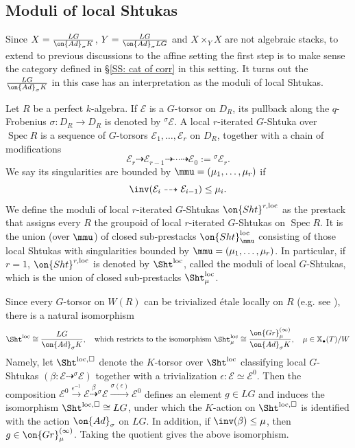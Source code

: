 \documentclass[11pt]{amsart}
\theoremstyle{definition}
\theoremstyle{definition}
\theoremstyle{definition}
\numberwithin{equation}{subsection}
\newcommand{\mE}{{\mathcal E}}
\newcommand{\Ad}{{\on{Ad}}}
\newcommand{\Gr}{{\on{Gr}}}
\DeclareMathOperator{\Spec}{Spec}
\newcommand{\loc}{\mathrm{loc}}
\def\xcoch{\mathbb{X}_\bullet}
\begin{document}
\subsection{Moduli of local Shtukas}

Since
$X=\frac{LG}{\Ad_\sigma K}$, $Y=\frac{LG}{\Ad_\sigma LG}$ and $X\times_YX$ are not algebraic stacks, to extend to previous discussions to the affine setting the first step is to make sense the category defined in \S \ref{SS: cat of corr} in this setting. It turns out 
the $\frac{LG}{\Ad_\sigma K}$ in this case has an interpretation as the moduli of local Shtukas.

Let $R$ be a perfect $k$-algebra.  If $\mE$ is a $G$-torsor on $D_R$, its pullback along the $q$-Frobenius $\sigma:D_R\to D_R$ is denoted by ${^\sigma}\mE$.
A local $r$-iterated $G$-Shtuka over $\Spec R$ is a sequence of $G$-torsors $\mE_1,\ldots, \mE_r$ on $D_{R}$, together with a chain of modifications
\[\mE_r\dashrightarrow \mE_{r-1}\dashrightarrow\cdots\dashrightarrow \mE_0:={^\sigma}\mE_r.\]
We say its singularities are bounded by $\mmu=(\mu_1,\ldots,\mu_r)$ if
\[\inv(\mE_i\dashrightarrow \mE_{i-1})\leq \mu_i.\]
We define the moduli of local $r$-iterated $G$-Shtukas $\on{Sht}^{r,\loc}$ as the prestack that assigns every $R$ the groupoid of local $r$-iterated $G$-Shtukas on $\Spec R$. It is the union (over $\mmu$) of closed sub-prestacks $\on{Sht}^{\loc}_{\mmu}$ consisting of those local Shtukas with singularities bounded by $\mmu=(\mu_1,\ldots,\mu_r)$.  In particular, if $r=1$, $\on{Sht}^{r,\loc}$ is denoted by $\Sht^\loc$, called the moduli of local $G$-Shtukas, which is the union of closed sub-prestacks $\Sht^\loc_\mu$.




Since every $G$-torsor on $W(R)$ can be trivialized \'etale locally on $R$ (e.g. see \cite[Lemma 1.3]{Zh1}), there is a natural isomorphism
\begin{equation}
\label{R:pre of Sht}
\Sht^\loc\cong \frac{LG}{\Ad_\sigma K},\quad \mbox{which restricts to the isomorphism } \Sht^\loc_\mu\cong \frac{\Gr_\mu^{(\infty)}}{\Ad_\sigma K},\ \ \ \mu\in \xcoch(T)/W
\end{equation}
Namely, let $\Sht^{\loc,\Box}$ denote the $K$-torsor over $\Sht^\loc$ classifying local $G$-Shtukas $(\beta:\mE\dashrightarrow {^\sigma}\mE)$ together with a trivialization $\epsilon: \mE\simeq \mE^0$. Then the composition $\mE^0\xrightarrow{\epsilon^{-1}}\mE\stackrel{\beta}{\dashrightarrow}{^\sigma}\mE\xrightarrow{\sigma(\epsilon)}\mE^0$ defines an element $g\in LG$ and induces the isomorphism $\Sht^{\loc,\Box}\cong LG$, under which the $K$-action on $\Sht^{\loc,\Box}$ is identified with the action $\Ad_\sigma$ on $LG$. In addition, if $\inv(\beta)\leq \mu$, then $g\in \Gr_{\mu}^{(\infty)}$. Taking the quotient gives the above isomorphism. 
 
\end{document}
